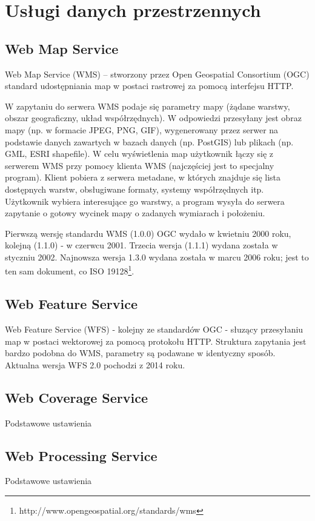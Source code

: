 \chapter{Usługi danych przestrzennych}
	\section{Web Map Service}
Web Map Service (WMS) – stworzony przez Open Geospatial Consortium (OGC) standard udostępniania map w postaci rastrowej za pomocą interfejsu HTTP.

W zapytaniu do serwera WMS podaje się parametry mapy (żądane warstwy, obszar geograficzny, układ współrzędnych). W odpowiedzi przesyłany jest obraz mapy (np. w formacie JPEG, PNG, GIF), wygenerowany przez serwer na podstawie danych zawartych w bazach danych (np. PostGIS) lub plikach (np. GML, ESRI shapefile).
W celu wyświetlenia map użytkownik łączy się z serwerem WMS przy pomocy klienta WMS (najczęściej jest to specjalny program). Klient pobiera z serwera metadane, w których znajduje się lista dostępnych warstw, obsługiwane formaty, systemy współrzędnych itp. Użytkownik wybiera interesujące go warstwy, a program wysyła do serwera zapytanie o gotowy wycinek mapy o zadanych wymiarach i położeniu.

Pierwszą wersję standardu WMS (1.0.0) OGC wydało w kwietniu 2000 roku, kolejną (1.1.0) - w czerwcu 2001. Trzecia wersja (1.1.1) wydana została w styczniu 2002. Najnowsza wersja 1.3.0 wydana została w marcu 2006 roku; jest to ten sam dokument, co ISO 19128\footnote{http://www.opengeospatial.org/standards/wms}.
	\section{Web Feature Service}
Web Feature Service (WFS) - kolejny ze standardów OGC - słuzący przesyłaniu map w postaci wektorowej za pomocą protokołu HTTP. Struktura zapytania jest bardzo podobna do WMS, parametry są podawane w identyczny sposób. Aktualna wersja WFS 2.0 pochodzi z 2014 roku.	
	\section{Web Coverage Service}
	Podstawowe ustawienia	 
	\section{Web Processing Service}
	Podstawowe ustawienia	

